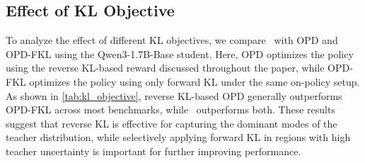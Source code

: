\subsection{Effect of KL Objective}\label{sec:kl_objective}
To analyze the effect of different KL objectives, we compare \method~with OPD and OPD-FKL using the Qwen3-1.7B-Base student. Here, OPD optimizes the policy using the reverse KL-based reward discussed throughout the paper, while OPD-FKL optimizes the policy using only forward KL under the same on-policy setup.
As shown in \autoref{tab:kl_objective}, reverse KL-based OPD generally outperforms OPD-FKL across most benchmarks, while \method~outperforms both. These results suggest that reverse KL is effective for capturing the dominant modes of the teacher distribution, while selectively applying forward KL in regions with high teacher uncertainty is important for further improving performance.

\begin{table}[ht]
\centering
\caption{
Comparison of different KL objectives for the Qwen3-1.7B-Base student. \method~outperforms both OPD and OPD-FKL across most benchmarks, while OPD generally outperforms OPD-FKL. \textbf{Bold} indicates the best performance and \underline{underline} indicates second-best.
}
\label{tab:kl_objective}
\end{table}


